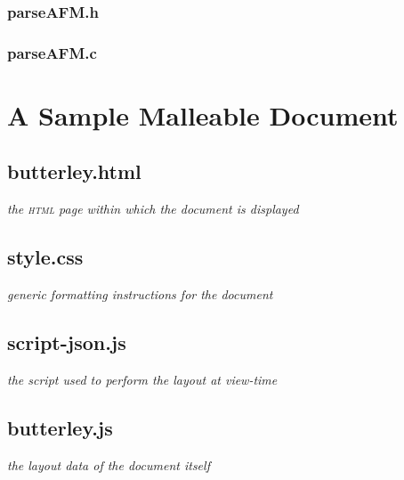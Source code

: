 \newpage

\subsection{parseAFM.h}


\newpage

\subsection{parseAFM.c}


\newpage

\cleardoublepage
\chapter{A Sample Malleable Document}
\label{app:sampledoc}
\section{butterley.html}
\emph{the \textsc{html} page within which the document is displayed}


\section{style.css}
\emph{generic formatting instructions for the document}

\newpage

\section{script-json.js}
\emph{the script used to perform the layout at view-time}


\newpage

\section{butterley.js}
\emph{the layout data of the document itself}

